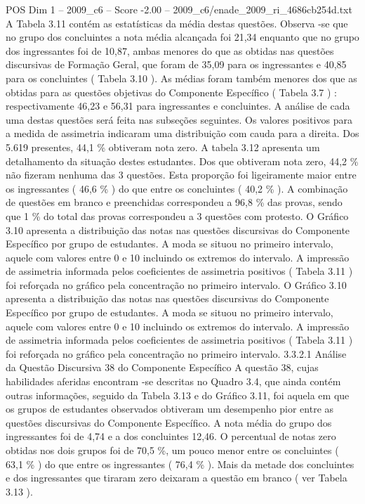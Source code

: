 \begin{textsample}{POS Dim 1 – 2009\_c6 – Score -2.00 – 2009\_c6/enade\_2009\_ri\_4686cb254d.txt}
A Tabela 3.11 contém as estatísticas da média destas questões.
Observa -se que no grupo dos concluintes a nota média alcançada foi 21,34 enquanto que no grupo dos ingressantes foi de 10,87, ambas menores do que as obtidas nas questões discursivas de Formação Geral, que foram de 35,09 para os ingressantes e 40,85 para os concluintes ( Tabela 3.10 ).
As médias foram também menores dos que as obtidas para as questões objetivas do Componente Específico ( Tabela 3.7 ) : respectivamente 46,23 e 56,31 para ingressantes e concluintes.
A análise de cada uma destas questões será feita nas subseções seguintes.
Os valores positivos para a medida de assimetria indicaram uma distribuição com cauda para a direita.
Dos 5.619 presentes, 44,1 \% obtiveram nota zero.
A tabela 3.12 apresenta um detalhamento da situação destes estudantes.
Dos que obtiveram nota zero, 44,2 \% não fizeram nenhuma das 3 questões.
Esta proporção foi ligeiramente maior entre os ingressantes ( 46,6 \% ) do que entre os concluintes ( 40,2 \% ).
A combinação de questões em branco e preenchidas correspondeu a 96,8 \% das provas, sendo que 1 \% do total das provas correspondeu a 3 questões com protesto.
O Gráfico 3.10 apresenta a distribuição das notas nas questões discursivas do Componente Específico por grupo de estudantes.
A moda se situou no primeiro intervalo, aquele com valores entre 0 e 10 incluindo os extremos do intervalo.
A impressão de assimetria informada pelos coeficientes de assimetria positivos ( Tabela 3.11 ) foi reforçada no gráfico pela concentração no primeiro intervalo.
O Gráfico 3.10 apresenta a distribuição das notas nas questões discursivas do Componente Específico por grupo de estudantes.
A moda se situou no primeiro intervalo, aquele com valores entre 0 e 10 incluindo os extremos do intervalo.
A impressão de assimetria informada pelos coeficientes de assimetria positivos ( Tabela 3.11 ) foi reforçada no gráfico pela concentração no primeiro intervalo. 3.3.2.1 Análise da Questão Discursiva 38 do Componente Específico A questão 38, cujas habilidades aferidas encontram -se descritas no Quadro 3.4, que ainda contém outras informações, seguido da Tabela 3.13 e do Gráfico 3.11, foi aquela em que os grupos de estudantes observados obtiveram um desempenho pior entre as questões discursivas do Componente Específico.
A nota média do grupo dos ingressantes foi de 4,74 e a dos concluintes 12,46.
O percentual de notas zero obtidas nos dois grupos foi de 70,5 \%, um pouco menor entre os concluintes ( 63,1 \% ) do que entre os ingressantes ( 76,4 \% ).
Mais da metade dos concluintes e dos ingressantes que tiraram zero deixaram a questão em branco ( ver Tabela 3.13 ).

\end{textsample}
